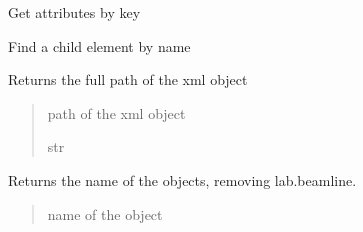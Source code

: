 \documentclass[letterpaper,10pt,english]{sphinxmanual}
\begin{document}
\begin{fulllineitems}
\begin{fulllineitems}
\label{\detokenize{code_documentation:raypyng.rml.BeamlineElement.get_attribute}}
\pysigstartsignatures
{}
\pysigstopsignatures
\sphinxAtStartPar
Get attributes by key

\end{fulllineitems}


\begin{fulllineitems}
\label{\detokenize{code_documentation:raypyng.rml.BeamlineElement.get_elements}}
\pysigstartsignatures
{}
\pysigstopsignatures
\sphinxAtStartPar
Find a child element by name

\end{fulllineitems}


\begin{fulllineitems}
\label{\detokenize{code_documentation:raypyng.rml.BeamlineElement.get_full_path}}
\pysigstartsignatures
{}
\pysigstopsignatures
\sphinxAtStartPar
Returns the full path of the xml object
\begin{quote}\begin{description}
\sphinxAtStartPar
path of the xml object

\sphinxAtStartPar
str

\end{description}\end{quote}

\end{fulllineitems}


\begin{fulllineitems}
\label{\detokenize{code_documentation:raypyng.rml.BeamlineElement.resolvable_name}}
\pysigstartsignatures
{}
\pysigstopsignatures
\sphinxAtStartPar
Returns the name of the objects, removing lab.beamline.
\begin{quote}\begin{description}
\sphinxAtStartPar
name of the object


\end{description}
\end{quote}
\end{fulllineitems}
\end{fulllineitems}
\end{document}
